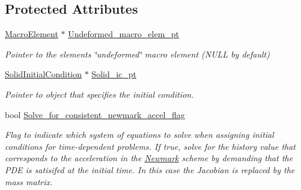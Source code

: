 \subsection*{Protected Attributes}
\begin{DoxyCompactItemize}
\item 
\hyperlink{classoomph_1_1MacroElement}{Macro\+Element} $\ast$ \hyperlink{classoomph_1_1SolidFiniteElement_a582281cb3abb1b0d120a2f3310e051f3}{Undeformed\+\_\+macro\+\_\+elem\+\_\+pt}
\begin{DoxyCompactList}\small\item\em Pointer to the element\textquotesingle{}s \char`\"{}undeformed\char`\"{} macro element (N\+U\+LL by default) \end{DoxyCompactList}\item 
\hyperlink{classoomph_1_1SolidInitialCondition}{Solid\+Initial\+Condition} $\ast$ \hyperlink{classoomph_1_1SolidFiniteElement_a65f789b537979bc3e1948ce529f1dabe}{Solid\+\_\+ic\+\_\+pt}
\begin{DoxyCompactList}\small\item\em Pointer to object that specifies the initial condition. \end{DoxyCompactList}\item 
bool \hyperlink{classoomph_1_1SolidFiniteElement_a52ba6cbb89b5edfe7592a49171aeb436}{Solve\+\_\+for\+\_\+consistent\+\_\+newmark\+\_\+accel\+\_\+flag}
\begin{DoxyCompactList}\small\item\em Flag to indicate which system of equations to solve when assigning initial conditions for time-\/dependent problems. If true, solve for the history value that corresponds to the acceleration in the \hyperlink{classoomph_1_1Newmark}{Newmark} scheme by demanding that the P\+DE is satisifed at the initial time. In this case the Jacobian is replaced by the mass matrix. \end{DoxyCompactList}\end{DoxyCompactItemize}
